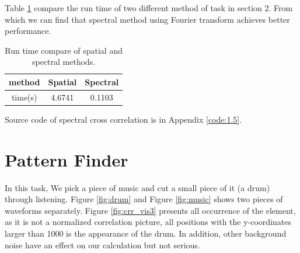 Table \ref{tab:run_time} compare the run time of two different method of task in section 2. From which we can find that spectral method using Fourier transform achieves better performance.

\begin{table}[h!]
	\centering
	\caption{Run time compare of spatial and spectral methods.}
	\begin{tabular}{c|c|c}
		\hline
		method & Spatial & Spectral \\
		\hline
		time(s) & 4.6741 & 0.1103 \\
		\hline
	\end{tabular}
	\label{tab:run_time}
\end{table}

Source code of spectral cross correlation is in Appendix \ref{code:1.5}.

\section{Pattern Finder}

In this task, We pick a piece of music and cut a small piece of it (a drum) through listening. Figure \ref{fig:drum} and Figure \ref{fig:music} shows two pieces of waveforms separately. Figure \ref{fig:crr_vis3} presents all occurrence of the element, as it is not a normalized correlation picture, all positions with the y-coordinates larger than 1000 is the appearance of the drum. In addition, other background noise have an effect on our calculation but not serious.

